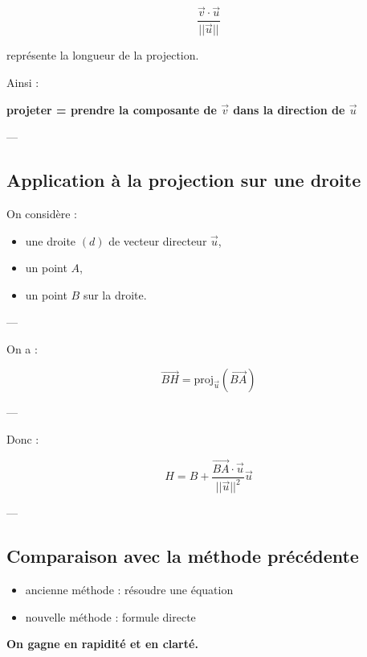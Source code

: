 \documentclass[11pt,a4paper]{article}
\begin{document}
\[
\frac{\vec{v} \cdot \vec{u}}{||\vec{u}||}
\]

représente la longueur de la projection.

\bigskip

Ainsi :

\begin{center}
\textbf{projeter = prendre la composante de $\vec{v}$ dans la direction de $\vec{u}$}
\end{center}

---

\subsection{Application à la projection sur une droite}

On considère :

\begin{itemize}
\item une droite $(d)$ de vecteur directeur $\vec{u}$,
\item un point $A$,
\item un point $B$ sur la droite.
\end{itemize}

---

On a :

\[
\vec{BH} = \text{proj}_{\vec{u}}(\vec{BA})
\]

---

Donc :

\[
\boxed{
H = B + \frac{\vec{BA} \cdot \vec{u}}{||\vec{u}||^2} \vec{u}
}
\]

---

\subsection{Comparaison avec la méthode précédente}

\begin{itemize}
\item ancienne méthode : résoudre une équation
\item nouvelle méthode : formule directe
\end{itemize}

\bigskip

\begin{center}
\textbf{On gagne en rapidité et en clarté.}
\end{center}
\end{document}
